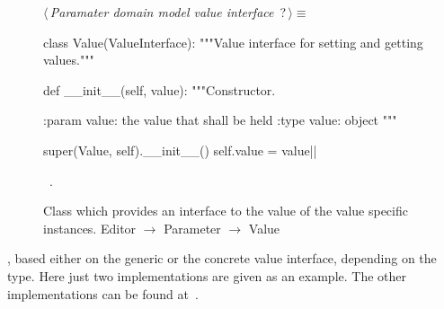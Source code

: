 \documentclass[%
    a4paper,    %
    justified,  %
    nobib,      %
    openany     %
]{tufte-book}
\begin{document}
\begin{figure}
\begin{flushleft} \small
\begin{minipage}{\linewidth}\label{scrap131}\raggedright\small
{} $\langle\,${\itshape Paramater domain model value interface}\nobreak\ {\footnotesize {?}}$\,\rangle\equiv$
\vspace{-1ex}
\begin{pythoncode}
class Value(ValueInterface):
    """Value interface for setting and getting values."""

    def __init__(self, value):
        """Constructor.

        :param value: the value that shall be held
        :type  value: object
        """

        super(Value, self).__init__()
        self.value = value|\NWsep|
\end{pythoncode}
\vspace{1.5ex}
\footnotesize
\begin{list}{}{\setlength{\itemsep}{-\parsep}\setlength{\itemindent}{-\leftmargin}}
\item \NWtxtMacroRefIn\ .

\item{}
\end{list}
\end{minipage}\vspace{4ex}
\end{flushleft}
\caption{Class which provides an interface to the value of the value specific
  instances.
  \newline{}\newline{}Editor $\rightarrow$ Parameter $\rightarrow$
  Value}
\label{editor:lst:parameter:value}
\end{figure}

, based either on the
generic or the concrete value interface, depending on the type. Here just two
implementations are given as an example. The other implementations can be found
at~.
\end{document}

